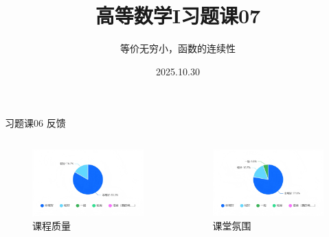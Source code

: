\documentclass[]{beamer}
\title{高等数学I\quad 习题课07}
\subtitle{等价无穷小，函数的连续性}
\date[2025.10.30]{2025.10.30}
\author[上海科技大学]{}
\institute[]{上海科技大学}
\begin{document}
\begin{frame}
    \vspace{15pt}
    \titlepage
\end{frame}


\begin{frame}{习题课06 反馈}
    \begin{columns}
        \begin{column}{0.5\textwidth}
            \begin{figure}[H]
                \centering
                \includegraphics[width=1.0\linewidth]{fb1.png}
                \caption{课程质量}
            \end{figure}
        \end{column}

        \begin{column}{0.5\textwidth}
            \begin{figure}[H]
                \centering
                \includegraphics[width=1.0\linewidth]{fb2.png}
                \caption{课堂氛围}
            \end{figure}
        \end{column}
    \end{columns}
\end{frame}
\end{document}
